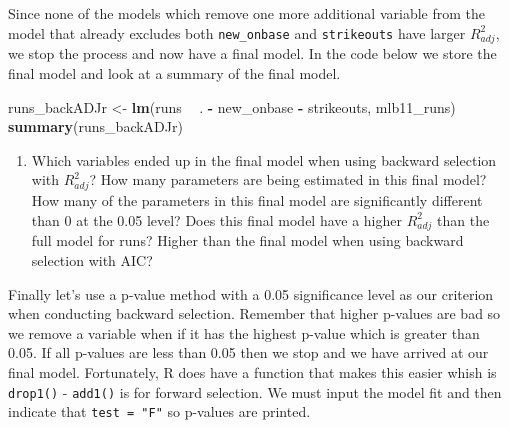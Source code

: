 \documentclass[]{book}
\newenvironment{Shaded}{\begin{snugshade}}{\end{snugshade}}
\newcommand{\KeywordTok}[1]{\textcolor[rgb]{0.13,0.29,0.53}{\textbf{#1}}}
\newcommand{\NormalTok}[1]{#1}
\newcommand{\OperatorTok}[1]{\textcolor[rgb]{0.81,0.36,0.00}{\textbf{#1}}}
\newcommand{\StringTok}[1]{\textcolor[rgb]{0.31,0.60,0.02}{#1}}
\providecommand{\tightlist}{%
  \setlength{\itemsep}{0pt}\setlength{\parskip}{0pt}}
\theoremstyle{definition}
\theoremstyle{definition}
\theoremstyle{definition}
\theoremstyle{remark}
\begin{document}
Since none of the models which remove one more additional variable from
the model that already excludes both \texttt{new\_onbase} and
\texttt{strikeouts} have larger \(R^2_{adj}\), we stop the process and
now have a final model. In the code below we store the final model and
look at a summary of the final model.

\begin{Shaded}
\begin{Highlighting}[]
\NormalTok{runs_backADJr <-}\StringTok{ }\KeywordTok{lm}\NormalTok{(runs }\OperatorTok{~}\StringTok{ }\NormalTok{. }\OperatorTok{-}\StringTok{ }\NormalTok{new_onbase }\OperatorTok{-}\StringTok{ }\NormalTok{strikeouts, mlb11_runs)}
\KeywordTok{summary}\NormalTok{(runs_backADJr)}
\end{Highlighting}
\end{Shaded}

\begin{enumerate}
\def\labelenumi{\arabic{enumi}.}
\setcounter{enumi}{2}
\tightlist
\item
  Which variables ended up in the final model when using backward
  selection with \(R^2_{adj}\)? How many parameters are being estimated
  in this final model? How many of the parameters in this final model
  are significantly different than 0 at the 0.05 level? Does this final
  model have a higher \(R^2_{adj}\) than the full model for runs? Higher
  than the final model when using backward selection with AIC?
\end{enumerate}

Finally let's use a p-value method with a 0.05 significance level as our
criterion when conducting backward selection. Remember that higher
p-values are bad so we remove a variable when if it has the highest
p-value which is greater than 0.05. If all p-values are less than 0.05
then we stop and we have arrived at our final model. Fortunately, R does
have a function that makes this easier whish is \texttt{drop1()} -
\texttt{add1()} is for forward selection. We must input the model fit
and then indicate that \texttt{test\ =\ "F"} so p-values are printed.
\end{document}
